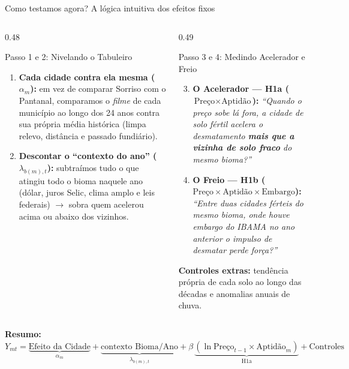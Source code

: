 \documentclass[aspectratio=169,10.5pt]{beamer}
\newcommand{\fonte}[1]{\par\vspace{1mm}{\fontsize{6.5}{7.5}\selectfont\color{gray}Fonte: #1\par}}
\begin{document}
\begin{frame}{Como testamos agora? A lógica intuitiva dos efeitos fixos}
\begin{columns}[T]
\begin{column}{0.48\textwidth}
\begin{block}{Passo 1 e 2: Nivelando o Tabuleiro}
\fontsize{8}{9.6}\selectfont
\begin{enumerate}
    \setlength{\itemsep}{1.1mm}
    \item \textbf{Cada cidade contra ela mesma ($\alpha_m$):} em vez de comparar Sorriso com o Pantanal, comparamos o \textit{filme} de cada município ao longo dos 24 anos contra sua própria média histórica (limpa relevo, distância e passado fundiário).
    \item \textbf{Descontar o ``contexto do ano'' ($\lambda_{b(m),t}$):} subtraímos tudo o que atingiu todo o bioma naquele ano (dólar, juros Selic, clima amplo e leis federais) $\rightarrow$ sobra quem acelerou acima ou abaixo dos vizinhos.
\end{enumerate}
\end{block}
\end{column}

\begin{column}{0.49\textwidth}
\begin{block}{Passo 3 e 4: Medindo Acelerador e Freio}
\fontsize{8}{9.6}\selectfont
\begin{enumerate}
    \setcounter{enumi}{2}
    \setlength{\itemsep}{1.1mm}
    \item \textbf{O Acelerador — H1a ($\text{Preço} \times \text{Aptidão}$):} \textit{``Quando o preço sobe lá fora, a cidade de solo fértil acelera o desmatamento \textbf{mais que a vizinha de solo fraco} do mesmo bioma?''}
    \item \textbf{O Freio — H1b ($\text{Preço} \times \text{Aptidão} \times \text{Embargo}$):} \textit{``Entre duas cidades férteis do mesmo bioma, onde houve embargo do IBAMA no ano anterior o impulso de desmatar perde força?''}
\end{enumerate}
\vspace{1mm}
{\fontsize{7.5}{9}\selectfont\color{cinza}\textbf{Controles extras:} tendência própria de cada solo ao longo das décadas e anomalias anuais de chuva.\par}
\end{block}
\end{column}
\end{columns}
\vspace{2mm}
\centering\fontsize{8.2}{9.8}\selectfont
\textbf{Resumo:} $Y_{mt} = \underbrace{\text{Efeito da Cidade}}_{\alpha_m} + \underbrace{\text{contexto Bioma/Ano}}_{\lambda_{b(m),t}} + \beta\,\underbrace{(\ln\text{Preço}_{t-1} \times \text{Aptidão}_m)}_{\text{H1a}} + \text{Controles}$
\end{frame}
\end{document}

